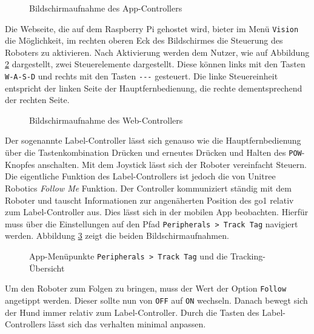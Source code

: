 \begin{figure}[h]
    \caption{Bildschirmaufnahme des App-Controllers}\label{fig:app-controller}
\end{figure}


Die Webseite, die auf dem Raspberry Pi gehostet wird, bieter im Menü \texttt{Vision} die Möglichkeit, im rechten
oberen Eck des Bildschirmes die Steuerung des Roboters zu aktivieren.
Nach Aktivierung werden dem Nutzer, wie auf Abbildung \ref{fig:web-controller} dargestellt, zwei Steuerelemente dargestellt.
Diese können links mit den Tasten \texttt{W-A-S-D} und rechts mit den Tasten \texttt{\textuparrow -\textleftarrow -\textdownarrow -\textrightarrow}
gesteuert.
Die linke Steuereinheit entspricht der linken Seite der Hauptfernbedienung, die rechte dementsprechend der rechten Seite.

\begin{figure}[h]
    \caption{Bildschirmaufnahme des Web-Controllers}\label{fig:web-controller}
\end{figure}


Der sogenannte Label-Controller lässt sich genauso wie die Hauptfernbedienung über die Tastenkombination Drücken und
erneutes Drücken und Halten des \texttt{POW}-Knopfes anschalten.
Mit dem Joystick lässt sich der Roboter vereinfacht Steuern.
Die eigentliche Funktion des Label-Controllers ist jedoch die von Unitree Robotics \emph{Follow Me} Funktion.
Der Controller kommuniziert ständig mit dem Roboter und tauscht Informationen zur angenäherten Position des \gls{go1} relativ
zum Label-Controller aus.
Dies lässt sich in der mobilen App beobachten.
Hierfür muss über die Einstellungen auf den Pfad \texttt{Peripherals > Track Tag} navigiert werden.
Abbildung \ref{fig:follow-me} zeigt die beiden Bildschirmaufnahmen.

\begin{figure}[h]
    \caption{App-Menüpunkte \texttt{Peripherals > Track Tag} und die Tracking-Übersicht}\label{fig:follow-me}
\end{figure}

Um den Roboter zum Folgen zu bringen, muss der Wert der Option \texttt{Follow} angetippt werden.
Dieser sollte nun von \texttt{OFF} auf \texttt{ON} wechseln.
Danach bewegt sich der Hund immer relativ zum Label-Controller.
Durch die Tasten des Label-Controllers lässt sich das verhalten minimal anpassen.

